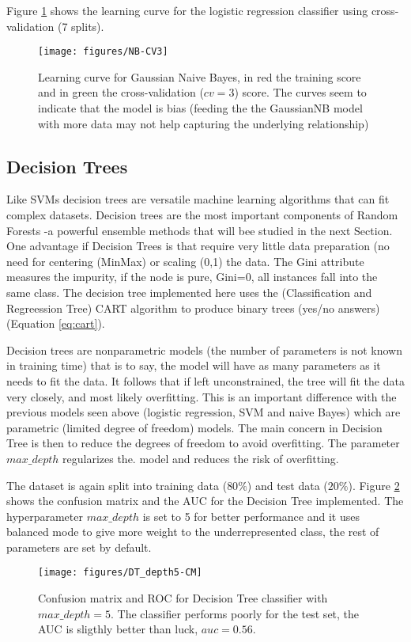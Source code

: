 \documentclass[11pt]{article}
\theoremstyle{definition}
\theoremstyle{remark}
\begin{document}
Figure \ref{fig:nb-cv3} shows the learning curve for the logistic regression classifier using cross-validation (7 splits).
\begin{figure}[H]
        \centering
        \texttt{[image: figures/NB-CV3]}
        \caption{Learning curve for Gaussian Naive Bayes, in red the training score and in green the cross-validation ($cv=3$) score. The curves seem to indicate that the model is bias (feeding the the GaussianNB model with more data may not help capturing the underlying relationship)
        } \label{fig:nb-cv3}
\end{figure}

\subsection{Decision Trees}
\label{se:resdectree}
Like SVMs decision trees are versatile machine learning algorithms that can fit complex datasets. Decision trees are the most important components of Random Forests -a powerful ensemble methods that will bee studied in the next Section.
One advantage if Decision Trees is that require very little data preparation (no need for centering (MinMax) or scaling (0,1) the data.
The Gini attribute measures the impurity, if the node is pure, Gini=0, all instances fall into the same class.
The decision tree implemented here uses the (Classification and Regreession Tree) CART algorithm to produce binary trees (yes/no answers) (Equation \ref{eq:cart}).
 
Decision trees are nonparametric models (the number of parameters is not known in training time) that is to say, the model will have as many parameters as it needs to fit the data. It follows that if left unconstrained, the tree will fit the data very closely, and most likely overfitting. This is an important difference with the previous models seen above (logistic regression, SVM and naive Bayes) which are parametric (limited degree of freedom) models. 
The main concern in Decision Tree is then to reduce the degrees of freedom to avoid overfitting. The parameter $max\_depth$ regularizes the. model and reduces the risk of overfitting.

The dataset is again split into training data ($80\%$) and test data ($20\%$). Figure \ref{fig:dt-md5} shows the confusion matrix and the AUC for the Decision Tree implemented. The hyperparameter $max\_depth$ is set to 5 for better performance and it uses balanced mode to give more weight to the underrepresented class, the rest of parameters are set by default.
\begin{figure}[H]
        \centering
        \texttt{[image: figures/DT\_depth5-CM]}
        \caption{Confusion matrix and ROC for Decision Tree classifier with $max\_depth=5$. The classifier performs poorly for the test set, the AUC is sligthly better than luck, $auc=0.56$.
        } \label{fig:dt-md5}
\end{figure}
\end{document}
